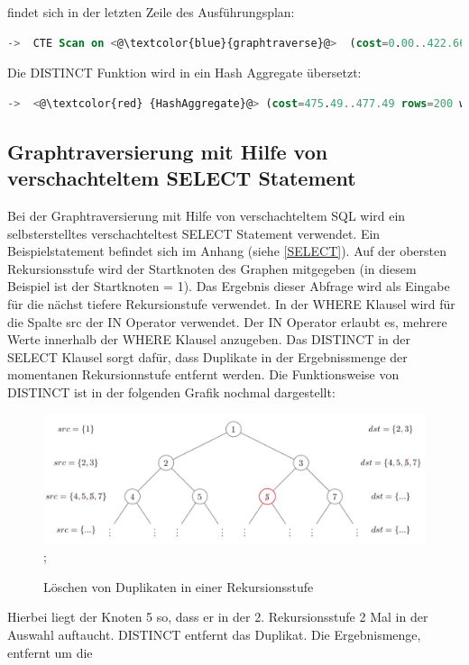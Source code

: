 findet sich in der letzten Zeile des Ausführungsplan:
\begin{lstlisting}[language=SQL,caption = Aufruf der graphtraverse Funktion im Ausführungsplan,frame=single, label={functionCallGraphtraverse} ]
    ->  CTE Scan on <@\textcolor{blue}{graphtraverse}@>  (cost=0.00..422.66 rows=21133 width=4) (actual time=0.015..16.921 rows=6056 loops=1)
\end{lstlisting}
Die DISTINCT Funktion wird in ein Hash Aggregate übersetzt:
\begin{lstlisting}[language=SQL,caption = Aufruf der DISTINCT Funktion,frame=single, label={WhereConditionCTE} ]
    ->  <@\textcolor{red} {HashAggregate}@> (cost=475.49..477.49 rows=200 width=4) (actual time=17.694..17.716 rows=321 loops=1)
\end{lstlisting}
\subsection{Graphtraversierung mit Hilfe von verschachteltem SELECT Statement}
Bei der Graphtraversierung mit Hilfe von verschachteltem \ac{SQL} wird ein selbsterstelltes verschachteltest SELECT Statement verwendet. Ein Beispielstatement
befindet sich im Anhang (siehe \ref{SELECT}). Auf der obersten Rekursionsstufe wird der Startknoten des Graphen mitgegeben (in diesem Beispiel ist der Startknoten = 1).
Das Ergebnis dieser Abfrage wird als Eingabe für die nächst tiefere Rekursionstufe verwendet. In der WHERE Klausel wird für die Spalte src der IN Operator verwendet.
Der IN Operator erlaubt es, mehrere Werte innerhalb der WHERE Klausel anzugeben. Das DISTINCT in der SELECT Klausel sorgt dafür, dass Duplikate in der Ergebnissmenge
der momentanen Rekursionnstufe entfernt werden. Die Funktionsweise von DISTINCT ist in der folgenden
Grafik nochmal dargestellt:
\begin{figure}[H]
    \includegraphics[width = \linewidth]{images/Distinct.jpg};
    \caption{Löschen von Duplikaten in einer Rekursionsstufe}
\end{figure}
Hierbei liegt der Knoten 5 so, dass er in der 2. Rekursionsstufe 2 Mal in der Auswahl auftaucht. DISTINCT entfernt das Duplikat. Die Ergebnismenge, entfernt um die
